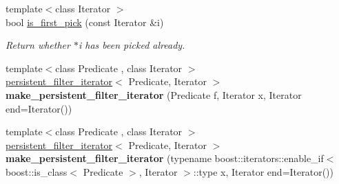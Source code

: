 \begin{DoxyCompactItemize}
\item 
{\footnotesize template$<$class Iterator $>$ }\\bool \hyperlink{namespacetrsl_a412db7961cfc65236d71610635038225}{is\_\-first\_\-pick} (const Iterator \&i)
\begin{DoxyCompactList}\small\item\em Return whether {\ttfamily $\ast$i} has been picked already. \item\end{DoxyCompactList}\item 
\hypertarget{namespacetrsl_ad8c5e8b27a1d741da83c4385fcbf97bb}{
{\footnotesize template$<$class Predicate , class Iterator $>$ }\\\hyperlink{classtrsl_1_1persistent__filter__iterator}{persistent\_\-filter\_\-iterator}$<$ Predicate, Iterator $>$ {\bfseries make\_\-persistent\_\-filter\_\-iterator} (Predicate f, Iterator x, Iterator end=Iterator())}
\label{namespacetrsl_ad8c5e8b27a1d741da83c4385fcbf97bb}

\item 
\hypertarget{namespacetrsl_ab88305e1f15b3fca3cbe4d001e9ceee1}{
{\footnotesize template$<$class Predicate , class Iterator $>$ }\\\hyperlink{classtrsl_1_1persistent__filter__iterator}{persistent\_\-filter\_\-iterator}$<$ Predicate, Iterator $>$ {\bfseries make\_\-persistent\_\-filter\_\-iterator} (typename boost::iterators::enable\_\-if$<$ boost::is\_\-class$<$ Predicate $>$, Iterator $>$::type x, Iterator end=Iterator())}
\label{namespacetrsl_ab88305e1f15b3fca3cbe4d001e9ceee1}


\end{DoxyCompactItemize}
